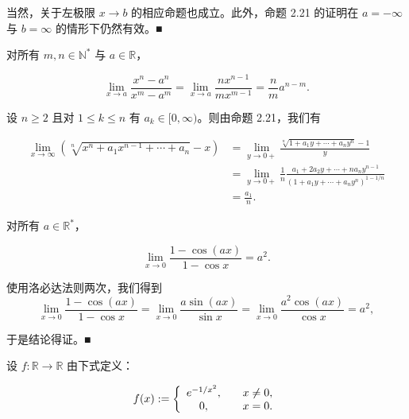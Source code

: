\begin{remark}

当然，关于左极限 $ x \to b $ 的相应命题也成立。此外，命题 2.21 的证明在 $ a = -\infty $ 与 $ b = \infty $ 的情形下仍然有效。■

\end{remark}

\begin{example}

\begin{items}
\item

对所有 $ m, n \in \mathbb{N}^* $ 与 $ a \in \mathbb{R} $，

\[
\lim_{x\to a}\frac{x^{n}-a^{n}}{x^{m}-a^{m}}=\lim_{x\to a}\frac{nx^{n-1}}{mx^{m-1}}=\frac{n}{m}a^{n-m}.
\]
\item

设 $ n \geq 2 $ 且对 $ 1 \leq k \leq n $ 有 $ a_k \in [0, \infty) $。则由命题 2.21，我们有

\begin{equation*}
\begin{aligned}
\lim_{x\to\infty}\left(\sqrt[n]{x^{n}+a_{1}x^{n-1}+\cdots+a_{n}}-x\right)&=\lim_{y\to0+}\frac{\sqrt[n]{1+a_{1}y+\cdots+a_{n}y^{n}}-1}{y}\\&=\lim_{y\to0+}\frac{1}{n}\frac{a_{1}+2a_{2}y+\cdots+na_{n} y^{n-1}}{(1+a_{1}y+\cdots+a_{n} y^{n})^{1-1/n}}\\&=\frac{a_{1}}{n}.
\end{aligned}
\end{equation*}
\item

对所有 $ a \in \mathbb{R}^* $，

\[
\lim_{x\to0}\frac{1-\cos(ax)}{1-\cos x}=a^{2}.
\]

\proofhead
使用洛必达法则两次，我们得到
\[
\lim_{x\to0}\frac{1-\cos(ax)}{1-\cos x}=\lim_{x\to0}\frac{a\sin(ax)}{\sin x}=\lim_{x\to0}\frac{a^{2}\cos(ax)}{\cos x}=a^{2},
\]

于是结论得证。■

\end{items}

\end{example}

\exerciseshead

\begin{exercises}
\item

设 $ f: \mathbb{R} \to \mathbb{R} $ 由下式定义：

\begin{equation*}
f(x):=\left\{\begin{array}{c l}{e^{-1/x^{2}},}&{\quad x\neq0,}\\ {0,}&{\quad x=0.}\\ \end{array}\right.
\end{equation*}
\end{exercises}

